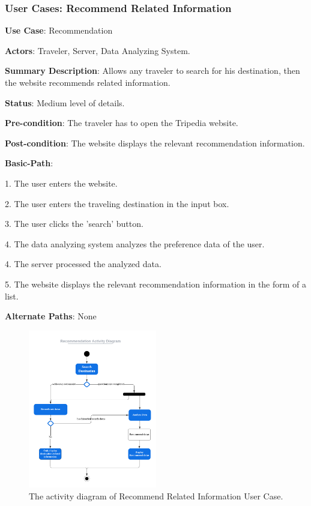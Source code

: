 \documentclass[conference]{IEEEtran}
\begin{document}
\subsubsection{User Cases: Recommend Related Information}

\textbf{ }

\textbf{Use Case}: Recommendation

\textbf{Actors}: Traveler, Server, Data Analyzing System.

\textbf{Summary Description}: Allows any traveler to search for his destination, then the website recommends related information.

\textbf{Status}: Medium level of details.

\textbf{Pre-condition}: The traveler has to open the Tripedia website.

\textbf{Post-condition}: The website displays the relevant recommendation information.

\textbf{Basic-Path}:

1. The user enters the website.

2. The user enters the traveling destination in the input box.

3. The user clicks the 'search' button.

4. The data analyzing system analyzes the preference data of the user.

4. The server processed the analyzed data.

5. The website displays the relevant recommendation information in the form of a list.

\textbf{Alternate Paths}:  None

\begin{figure}[htbp]
	\centerline{\includegraphics[width=0.5\textwidth]{Recommendation_Activity_diagram.pdf}}
	\caption{The activity diagram of Recommend Related Information User Case.}
	\label{fig6}
\end{figure}
\end{document}
